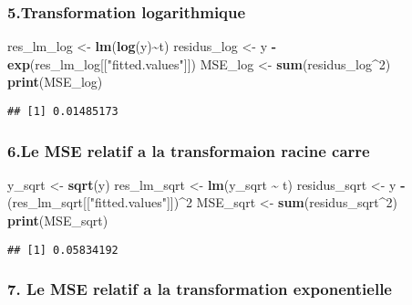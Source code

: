 \documentclass[
]{article}
\newenvironment{Shaded}{\begin{snugshade}}{\end{snugshade}}
\newcommand{\DecValTok}[1]{\textcolor[rgb]{0.00,0.00,0.81}{#1}}
\newcommand{\FunctionTok}[1]{\textcolor[rgb]{0.13,0.29,0.53}{\textbf{#1}}}
\newcommand{\NormalTok}[1]{#1}
\newcommand{\OtherTok}[1]{\textcolor[rgb]{0.56,0.35,0.01}{#1}}
\newcommand{\SpecialCharTok}[1]{\textcolor[rgb]{0.81,0.36,0.00}{\textbf{#1}}}
\newcommand{\StringTok}[1]{\textcolor[rgb]{0.31,0.60,0.02}{#1}}
\begin{document}
\subsubsection{5.Transformation
logarithmique}\label{transformation-logarithmique}

\begin{Shaded}
\begin{Highlighting}[]
\NormalTok{res\_lm\_log }\OtherTok{\textless{}{-}} \FunctionTok{lm}\NormalTok{(}\FunctionTok{log}\NormalTok{(y)}\SpecialCharTok{\textasciitilde{}}\NormalTok{t)}
\NormalTok{residus\_log }\OtherTok{\textless{}{-}}\NormalTok{ y }\SpecialCharTok{{-}} \FunctionTok{exp}\NormalTok{(res\_lm\_log[[}\StringTok{"fitted.values"}\NormalTok{]])}
\NormalTok{MSE\_log }\OtherTok{\textless{}{-}} \FunctionTok{sum}\NormalTok{(residus\_log}\SpecialCharTok{\^{}}\DecValTok{2}\NormalTok{)}
\FunctionTok{print}\NormalTok{(MSE\_log)}
\end{Highlighting}
\end{Shaded}

\begin{verbatim}
## [1] 0.01485173
\end{verbatim}

\subsubsection{6.Le MSE relatif a la transformaion racine
carre}\label{le-mse-relatif-a-la-transformaion-racine-carre}

\begin{Shaded}
\begin{Highlighting}[]
\NormalTok{y\_sqrt }\OtherTok{\textless{}{-}} \FunctionTok{sqrt}\NormalTok{(y)}
\NormalTok{res\_lm\_sqrt }\OtherTok{\textless{}{-}} \FunctionTok{lm}\NormalTok{(y\_sqrt }\SpecialCharTok{\textasciitilde{}}\NormalTok{ t)}
\NormalTok{residus\_sqrt }\OtherTok{\textless{}{-}}\NormalTok{ y }\SpecialCharTok{{-}}\NormalTok{ (res\_lm\_sqrt[[}\StringTok{"fitted.values"}\NormalTok{]])}\SpecialCharTok{\^{}}\DecValTok{2}
\NormalTok{MSE\_sqrt }\OtherTok{\textless{}{-}} \FunctionTok{sum}\NormalTok{(residus\_sqrt}\SpecialCharTok{\^{}}\DecValTok{2}\NormalTok{)}
\FunctionTok{print}\NormalTok{(MSE\_sqrt)}
\end{Highlighting}
\end{Shaded}

\begin{verbatim}
## [1] 0.05834192
\end{verbatim}

\subsubsection{7. Le MSE relatif a la transformation
exponentielle}\label{le-mse-relatif-a-la-transformation-exponentielle}
\end{document}

